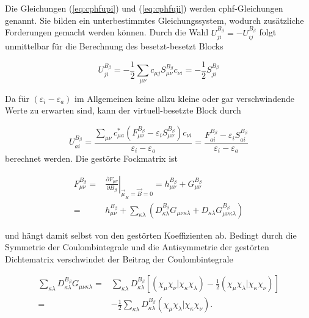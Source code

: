     
    Die Gleichungen (\ref{eq:cphfupi}) und (\ref{eq:cphfuji}) werden \ac{cphf}-Gleichungen genannt.\supercite{gerratt1968force} Sie bilden ein unterbestimmtes Gleichungssystem, wodurch zusätzliche Forderungen gemacht werden können.\supercite{weigendphdthesis} Durch die Wahl  $U_{ji}^{B_\beta}=-U_{ij}^{B_\beta}$ folgt unmittelbar für die Berechnung des besetzt-besetzt Blocks
    
    \begin{equation}\label{eq:uji}
    U_{ji}^{B_\beta}=-\frac{1}{2}\sum_{\mu\nu}c_{\mu j}S_{\mu\nu}^{B_\beta}c_{\nu i}=-\frac{1}{2}S_{ji}^{B_\beta}
    \end{equation}
    
    Da für $\left(\varepsilon_i-\varepsilon_a\right)$ im Allgemeinen keine allzu kleine oder gar verschwindende Werte zu erwarten sind, kann der virtuell-besetzte Block durch
    
    \begin{equation}\label{eq:uai}
    U_{ai}^{B_\beta}=\frac{\sum_{\mu\nu}c_{\mu a}^*\left(F_{\mu\nu}^{B_\beta}-\varepsilon_i S_{\mu\nu}^{B_\beta}\right)c_{\nu i}}{\varepsilon_i-\varepsilon_a}=\frac{F_{ai}^{B_\beta}-\varepsilon_i S_{ai}^{B_\beta}}{\varepsilon_i-\varepsilon_a}
    \end{equation}
    berechnet werden. Die gestörte Fockmatrix ist
    
    \begin{equation}\label{eq:fmunudb}
    \begin{aligned}
    F_{\mu\nu}^{B_\beta}=&\left.\frac{\partial F_{\mu\nu}}{\partial B_\beta}\right\vert_{\vec{\mu}_K=\vec{B}=0}=h_{\mu\nu}^{B_\beta}+G_{\mu\nu}^{B_\beta}\\
    =&h_{\mu\nu}^{B_\beta}+\sum_{\kappa\lambda}\left(D_{\kappa\lambda}^{B_\beta}G_{\mu\nu\kappa\lambda}+D_{\kappa\lambda}G_{\mu\nu\kappa\lambda}^{B_\beta}\right)
    \end{aligned}
    \end{equation}
    
    und hängt damit selbst von den gestörten Koeffizienten ab. Bedingt durch die Symmetrie der Coulombintegrale und die Antisymmetrie der gestörten Dichtematrix verschwindet der Beitrag der Coulombintegrale 
    
    \begin{equation}\label{eq:dkaladbg}
    \begin{aligned}
    \sum_{\kappa\lambda}D_{\kappa\lambda}^{B_\beta}G_{\mu\nu\kappa\lambda}=& \sum_{\kappa\lambda}D_{\kappa\lambda}^{B_\beta}\left[\left(\chi_{\mu}\chi_{\nu}|\chi_{\kappa}\chi_{\lambda}\right)-\frac{1}{2}\left(\chi_{\mu}\chi_{\lambda}|\chi_{\kappa}\chi_{\nu}\right)\right] \\
    =&-\frac{1}{2}\sum_{\kappa\lambda}D_{\kappa\lambda}^{B_\beta}\left(\chi_{\mu}\chi_{\lambda}|\chi_{\kappa}\chi_{\nu}\right).
    \end{aligned}
    \end{equation}
    
